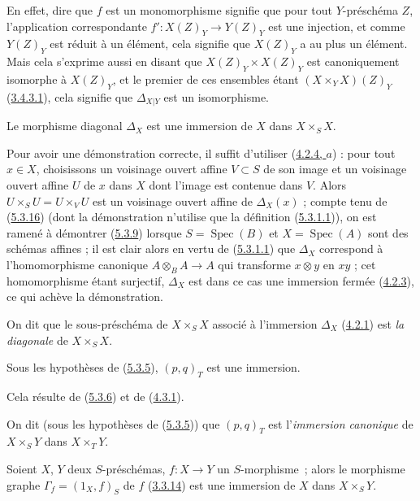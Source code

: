 En effet, dire que $f$ est un monomorphisme signifie que pour tout
$Y$-préschéma $Z$, l'application correspondante
$f':X(Z)_Y\to Y(Z)_Y$ est une injection, et comme $Y(Z)_Y$ est réduit à un
élément, cela signifie que $X(Z)_Y$ a au plus un élément. Mais cela s'exprime
aussi en disant que $X(Z)_Y\times X(Z)_Y$ est canoniquement isomorphe à
$X(Z)_Y$, et le premier de ces ensembles étant $(X\times_Y X)(Z)_Y$
(\hyperref[I.3.4.3.1-fr]{3.4.3.1}), cela signifie que $\Delta_{X|Y}$ est un
isomorphisme.

\begin{proposition}[5.3.9]
\label{I.5.3.9-fr}
Le morphisme diagonal $\Delta_X$ est une immersion de $X$ dans
$X\times_S X$.
\end{proposition}

Pour avoir une démonstration correcte, il
suffit d'utiliser (\hyperref[I.4.2.4-fr]{4.2.4, $a$}) : pour tout $x\in X$, choisissons un voisinage ouvert affine $V\subset S$
de son image et un voisinage ouvert affine $U$ de $x$ dans $X$ dont
l'image est contenue dans $V$. Alors $U\times_SU=U\times_VU$ est un
voisinage ouvert affine de $\Delta_X(x)$ ;
compte tenu de (\hyperref[I.5.3.16-fr]{5.3.16}) (dont la démonstration n'utilise que la définition
(\hyperref[I.5.3.1.1-fr]{5.3.1.1})), on est ramené à démontrer (\hyperref[I.5.3.9-fr]{5.3.9}) lorsque
$S=\operatorname{Spec}(B)$ et $X=\operatorname{Spec}(A)$ sont des schémas
affines ; il est clair alors en vertu de (\hyperref[I.5.3.1.1-fr]{5.3.1.1}) que $\Delta_X$ correspond à
l'homomorphisme canonique $A\otimes_BA\to A$ qui transforme $x\otimes y$ en
$xy$ ; cet homomorphisme étant surjectif, $\Delta_X$ est dans ce cas une
immersion fermée (\hyperref[I.4.2.3-fr]{4.2.3}), ce qui achève la démonstration.

On dit que le sous-préschéma de $X\times_S X$ associé à l'immersion
$\Delta_X$ (\hyperref[I.4.2.1-fr]{4.2.1}) est \emph{la diagonale} de
$X\times_S X$.

\begin{corollary}[5.3.10]
\label{I.5.3.10-fr}
Sous les hypothèses de (\hyperref[I.5.3.5-fr]{5.3.5}), $(p,q)_T$ est une
immersion.
\end{corollary}

Cela résulte de (\hyperref[I.5.3.6-fr]{5.3.6}) et de
(\hyperref[I.4.3.1-fr]{4.3.1}).

On dit (sous les hypothèses de (\hyperref[I.5.3.5-fr]{5.3.5})) que $(p,q)_T$
est l'\emph{immersion canonique} de $X\times_S Y$ dans $X\times_T Y$.

\begin{corollary}[5.3.11]
\label{I.5.3.11-fr}
Soient $X$, $Y$ deux $S$-préschémas, $f:X\to Y$ un $S$-morphisme~; alors le
morphisme graphe $\Gamma_f=(1_X,f)_S$ de $f$
(\hyperref[I.3.3.14-fr]{3.3.14}) est une immersion de $X$ dans
$X\times_S Y$.
\end{corollary}

